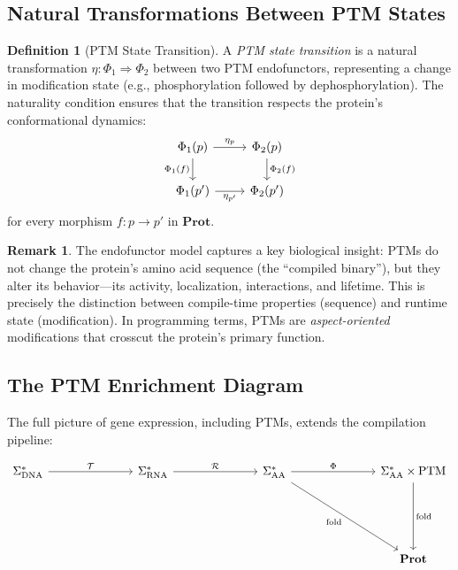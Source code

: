 \documentclass[12pt,a4paper]{article}
\theoremstyle{definition}
\newtheorem{definition}[theorem]{Definition}
\newtheorem{remark}[theorem]{Remark}
\newcommand{\cat}[1]{\mathbf{#1}}
\begin{document}
\subsection{Natural Transformations Between PTM States}

\begin{definition}[PTM State Transition]\label{def:ptm-transition}
A \emph{PTM state transition} is a natural transformation $\eta \colon \Phi_1 \Rightarrow \Phi_2$ between two PTM endofunctors, representing a change in modification state (e.g., phosphorylation followed by dephosphorylation). The naturality condition ensures that the transition respects the protein's conformational dynamics:
\[
\begin{tikzcd}
  \Phi_1(p) \arrow[r, "\eta_p"] \arrow[d, "\Phi_1(f)"'] & \Phi_2(p) \arrow[d, "\Phi_2(f)"] \\
  \Phi_1(p') \arrow[r, "\eta_{p'}"'] & \Phi_2(p')
\end{tikzcd}
\]
for every morphism $f \colon p \to p'$ in $\cat{Prot}$.
\end{definition}

\begin{remark}
The endofunctor model captures a key biological insight: PTMs do not change the protein's amino acid sequence (the ``compiled binary''), but they alter its behavior---its activity, localization, interactions, and lifetime. This is precisely the distinction between compile-time properties (sequence) and runtime state (modification). In programming terms, PTMs are \emph{aspect-oriented} modifications that crosscut the protein's primary function.
\end{remark}

\subsection{The PTM Enrichment Diagram}

The full picture of gene expression, including PTMs, extends the compilation pipeline:

\begin{equation}\label{eq:ptm-pipeline}
\begin{tikzcd}[column sep=2.5cm, row sep=2cm]
  \Sigma_\mathrm{DNA}^*
    \arrow[r, "\mathcal{T}"]
  & \Sigma_\mathrm{RNA}^*
    \arrow[r, "\mathcal{R}"]
  & \Sigma_\mathrm{AA}^*
    \arrow[r, "\Phi"]
    \arrow[dr, "\text{fold}"']
  & \Sigma_\mathrm{AA}^* \times \text{PTM}
    \arrow[d, "\text{fold}"]
  \\
  & & & \cat{Prot}
\end{tikzcd}
\end{equation}
\end{document}
